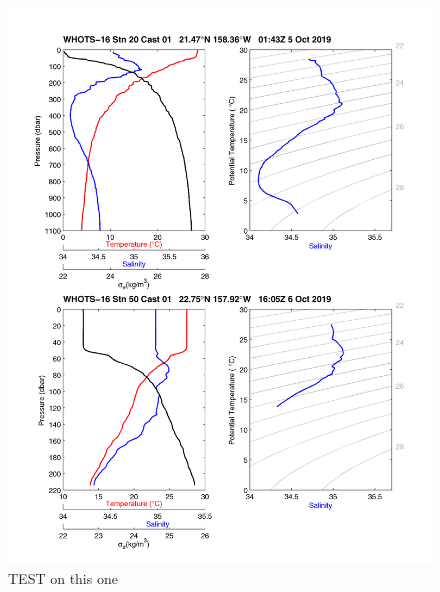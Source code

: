 \begin{figure}[htbp]
	\begin{center}
		 \includegraphics{2.Figures/ctd/2.whots_/s20c1_s50c1.png}
		 \caption{TEST on this one}
		 \label{fig:test1}
	\end{center}
\end{figure}                                      
